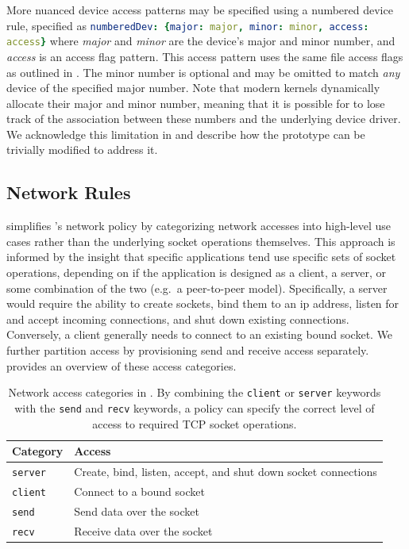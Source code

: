 More nuanced device access patterns may be specified using a numbered device rule,
specified as \lstinline[language=yaml]|numberedDev: {major: major, minor: minor, access: access}|
where \textit{major} and \textit{minor} are the device's major and minor number,
and \textit{access} is an access flag pattern. This access pattern uses the same file
access flags as outlined in . The minor number is
optional and may be omitted to match \textit{any} device of the specified major number.
Note that modern kernels dynamically allocate their major and minor number, meaning that
it is possible for \bpfcontain{} to lose track of the association between these numbers
and the underlying device driver.  We acknowledge this limitation in
 and describe how the \bpfcontain{} prototype can be trivially
modified to address it.

\subsection{Network Rules}

\bpfcontain{} simplifies \bpfbox{}'s network policy by categorizing network accesses into
high-level use cases rather than the underlying socket operations themselves. This
approach is informed by the insight that specific applications tend use specific sets of
socket operations, depending on if the application is designed as a client, a server, or
some combination of the two (e.g.\ a peer-to-peer model). Specifically, a server would
require the ability to create sockets, bind them to an \gls{ip} address, listen for and
accept incoming connections, and shut down existing connections. Conversely, a client
generally needs to connect to an existing bound socket. We further partition access by
provisioning send and receive access separately.  provides an
overview of these access categories.

\begin{table}[htpb]
  \centering
  \caption[Network access categories in \bpfcontain{}]{
    Network access categories in \bpfcontain{}. By combining the \texttt{client} or
    \texttt{server} keywords with the \texttt{send} and \texttt{recv} keywords, a policy
    can specify the correct level of access to required TCP socket operations.
  }%
  \label{tab:bpfcontain-network}
  \begin{tabular}{ll}
  \toprule
  Category & Access \\
  \midrule
  \texttt{server} & Create, bind, listen, accept, and shut down socket connections \\
  \texttt{client} & Connect to a bound socket \\
  \texttt{send} & Send data over the socket \\
  \texttt{recv} & Receive data over the socket \\
  \bottomrule
  \end{tabular}
\end{table}

